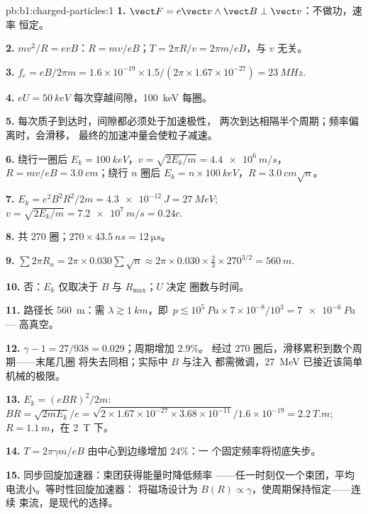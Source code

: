 \begin{solution}{pb:b1:charged-particles:1}
\textbf{1.} $\vect F = e\vect v\wedge\vect B \perp \vect v$：不做功，速率
恒定。

\textbf{2.} $mv^2/R = evB$：$R = mv/eB$；$T = 2\pi R/v = 2\pi m/eB$，与
$v$ 无关。

\textbf{3.} $f_c = eB/2\pi m = 1.6\times10^{-19} \times 1.5/(2\pi \times 1.67
\times10^{-27}) = \qty{23}{MHz}$.

\textbf{4.} $eU = \qty{50}{keV}$ 每次穿越间隙，\qty{100}{keV} 每圈。

\textbf{5.} 每次质子到达时，间隙都必须处于加速极性，
两次到达相隔半个周期；频率偏离时，会滑移，
最终的加速冲量会使粒子减速。

\textbf{6.} 绕行一圈后 $E_k = \qty{100}{keV}$，$v = \sqrt{2E_k/m} =
\qty{4.4e6}{m/s}$，$R = mv/eB = \qty{3.0}{cm}$；绕行 $n$ 圈后 $E_k =
n \times \qty{100}{keV}$，$R = \qty{3.0}{cm}\sqrt n$。

\textbf{7.} $E_k = e^2B^2R^2/2m = \qty{4.3e-12}{J} = \qty{27}{MeV}$; $v =
\sqrt{2E_k/m} = \qty{7.2e7}{m/s} = 0.24c$.

\textbf{8.} 共 $270$ 圈；$270 \times \qty{43.5}{ns} = \qty{12}{\micro s}$。

\textbf{9.} $\sum 2\pi R_n = 2\pi \times 0.030\sum\sqrt n \approx 2\pi \times 0.030
\times \tfrac23 \times 270^{3/2} = \qty{560}{m}$.

\textbf{10.} 否：$E_k$ 仅取决于 $B$ 与 $R_{\max}$；$U$ 决定
圈数与时间。

\textbf{11.} 路径长 \qty{560}{m}：需 $\lambda \gtrsim \qty{1}{km}$，即\
$p \lesssim 10^5\ \unit{Pa} \times 7\times10^{-8}/10^3 = \qty{7e-6}{Pa}$ ---
高真空。

\textbf{12.} $\gamma - 1 = 27/938 = 0.029$；周期增加 $2.9\%$。
经过 $270$ 圈后，滑移累积到数个周期——末尾几圈
将失去同相；实际中 $B$ 与注入
都需微调，\qty{27}{MeV} 已接近该简单机械的极限。

\textbf{13.} $E_k = (eBR)^2/2m$: $BR = \sqrt{2mE_k}/e = \sqrt{2 \times 1.67\times
10^{-27} \times 3.68\times10^{-11}}/1.6\times10^{-19} = \qty{2.2}{T.m}$; $R =
\qty{1.1}{m}$，在 \qty{2}{T} 下。

\textbf{14.} $T = 2\pi\gamma m/eB$ 由中心到边缘增加 $24\%$：一
个固定频率将彻底失步。

\textbf{15.} 同步回旋加速器：束团获得能量时降低频率
——任一时刻仅一个束团，平均电流小。等时性回旋加速器：
将磁场设计为 $B(R) \propto \gamma$，使周期保持恒定——连续
束流，是现代的选择。


\end{solution}
